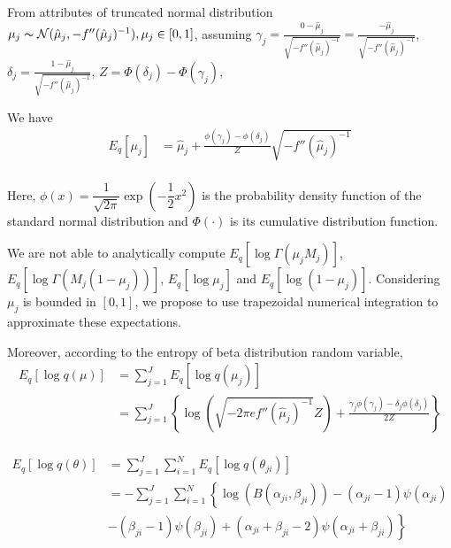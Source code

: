 \documentclass[11pt,reqno]{amsart}
\begin{document}
From attributes of truncated normal distribution $ \mu_j \thicksim \mathcal{N}(\hat{\mu}_j, -f''(\hat{\mu}_j)^{-1}), \mu_j \in [0,1] $, assuming
$ \gamma_j = \frac{0 - \hat{\mu}_j}{\sqrt{-f''(\hat{\mu}_j)^{-1}}}= \frac{- \hat{\mu}_j}{\sqrt{-f''(\hat{\mu}_j)^{-1}}}$, $ \delta_j = \frac{1-\hat{\mu}_j}{\sqrt{-f''(\hat{\mu}_j)^{-1}}}$, $ Z = \Phi(\delta_j) - \Phi(\gamma_j)$,

We have
\begin{align}
E_q \left[ \mu_j \right] &= \hat{\mu}_j + \frac{\phi(\gamma_j) - \phi(\delta_j)}{Z}\sqrt{-f''(\hat{\mu}_j)^{-1}}\nonumber \\
\end{align}

Here, $ \phi(x) = \dfrac{1}{\sqrt{2\pi}}\exp(-\dfrac{1}{2}x^2) $ is the probability density function of the standard normal distribution and $ \Phi(\cdot) $ is its cumulative distribution function. 

We are not able to analytically compute $  E_q  \left[ \log \Gamma(\mu_j M_j) \right] $, $ E_q  \left[ \log \Gamma(M_j (1-\mu_j)) \right] $, $ E_q  \left[ \log \mu_j \right] $ and $ E_q  \left[ \log (1 - \mu_j)\right]$. Considering $ \mu_j $ is bounded in $ [0,1] $, we propose to use trapezoidal numerical integration to approximate these expectations.


Moreover, according to the entropy of beta distribution random variable,
\begin{equation}
\begin{split}
E_q \left[ \log q\left(\mu \right)\right] &= \sum_{j=1}^{J} E_q \left[ \log q(\mu_j)\right] \\
&= \sum_{j=1}^{J} \left\lbrace \log (\sqrt{-2 \pi e f''(\hat{\mu}_j)^{-1}} Z) 
+ \frac{\gamma_j \phi(\gamma_j) - \delta_j \phi(\delta_j)}{2 Z} \right\rbrace \\ 
\end{split}
\end{equation}

\begin{equation}
\begin{split}
E_q \left[ \log q\left(\theta \right)\right] &= \sum_{j=1}^{J}\sum_{i=1}^{N} E_q\left[ \log q(\theta_{ji})\right] \\
&= -\sum_{j=1}^{J}\sum_{i=1}^{N} \left\lbrace \log (B(\alpha_{ji},\beta_{ji}))-(\alpha_{ji}-1)\psi(\alpha_{ji})\right.\\
\quad &- \left.(\beta_{ji}-1)\psi(\beta_{ji})+
(\alpha_{ji}+\beta_{ji}-2)\psi(\alpha_{ji}+\beta_{ji})\right\rbrace 
\end{split}
\end{equation}
\end{document}
